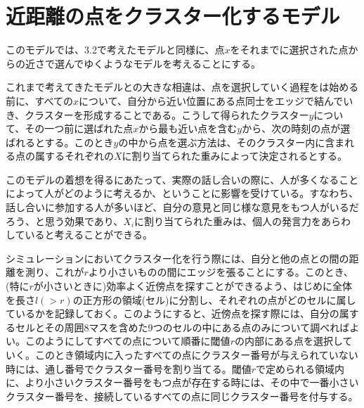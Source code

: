 \section{近距離の点をクラスター化するモデル}

このモデルでは、3.2で考えたモデルと同様に、点$x$をそれまでに選択された点からの近さで選んでゆくようなモデルを考えることにする。

これまで考えてきたモデルとの大きな相違は、点を選択していく過程をは始める前に、すべての$x$について、自分から近い位置にある点同士をエッジで結んでいき、クラスターを形成することである。こうして得られたクラスター$y$について、その一つ前に選ばれた点$x$から最も近い点を含む$y$から、次の時刻の点が選ばれるとする。このとき$y$の中から点を選ぶ方法は、そのクラスター内に含まれる点の属するそれぞれの$X$に割り当てられた重みによって決定されるとする。

このモデルの着想を得るにあたって、実際の話し合いの際に、人が多くなることによって人がどのように考えるか、ということに影響を受けている。すなわち、話し合いに参加する人が多いほど、自分の意見と同じ様な意見をもつ人がいるだろう、と思う効果であり、$X_{i}$に割り当てられた重みは、個人の発言力をあらわしていると考えることができる。

シミュレーションにおいてクラスター化を行う際には、自分と他の点との間の距離を測り、これが$r$より小さいものの間にエッジを張ることにする。このとき、(特に$r$が小さいときに)効率よく近傍点を探すことができるよう、はじめに全体を長さ$l(>r)$の正方形の領域(セル)に分割し、それぞれの点がどのセルに属しているかを記録しておく。このようにすると、近傍点を探す際には、自分の属するセルとその周囲8マスを含めた9つのセルの中にある点のみについて調べればよい。このようにしてすべての点について順番に閾値$r$の内部にある点を選択していく。このとき領域内に入ったすべての点にクラスター番号が与えられていない時には、通し番号でクラスター番号を割り当てる。閾値$r$で定められる領域内に、より小さいクラスター番号をもつ点が存在する時には、その中で一番小さいクラスター番号を、接続しているすべての点に同じクラスター番号を付与する。
